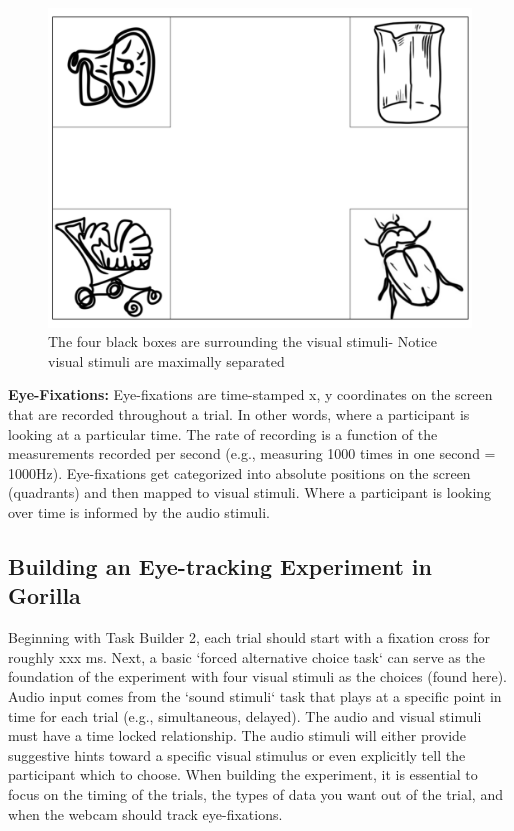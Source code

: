 \begin{figure}[h]
    \centering
    \includegraphics[scale=.35]{figures/Visual_stimuli.png}
    \caption{The four black boxes are surrounding the visual stimuli- Notice visual stimuli are maximally separated}
    \label{fig:Visual_stimuli.png}
\end{figure}

\textbf{Eye-Fixations:} Eye-fixations are time-stamped x, y coordinates on the screen that are recorded throughout a trial. In other words, where a participant is looking at a particular time. The rate of recording is a function of the measurements recorded per second (e.g., measuring 1000 times in one second = 1000Hz). Eye-fixations get categorized into absolute positions on the screen (quadrants) and then mapped to visual stimuli. Where a participant is looking over time is informed by the audio stimuli.

\subsection{Building an Eye-tracking Experiment in Gorilla}

Beginning with Task Builder 2, each trial should start with a fixation cross for roughly xxx ms. Next, a basic `forced alternative choice task` can serve as the foundation of the experiment with four visual stimuli as the choices (found here). Audio input comes from the `sound stimuli` task that plays at a specific point in time for each trial (e.g., simultaneous, delayed). The audio and visual stimuli must have a time locked relationship. The audio stimuli will either provide suggestive hints toward a specific visual stimulus or even explicitly tell the participant which to choose. When building the experiment, it is essential to focus on the timing of the trials, the types of data you want out of the trial, and when the webcam should track eye-fixations. 

